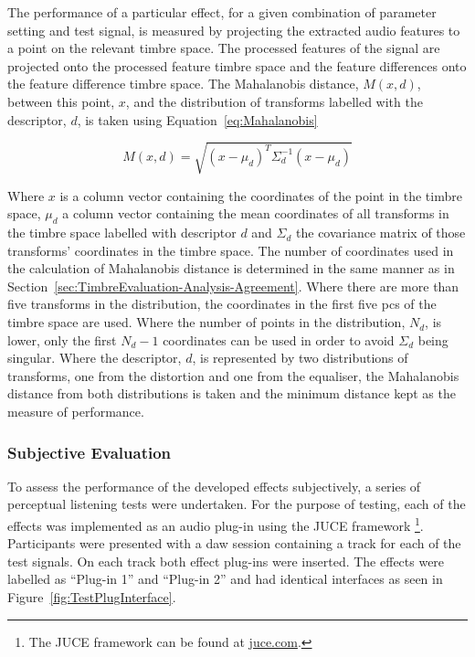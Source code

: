 			The performance of a particular effect, for a given combination of parameter setting and test
			signal, is measured by projecting the extracted audio features to a point on the relevant timbre
			space. The processed features of the signal are projected onto the processed feature timbre space
			and the feature differences onto the feature difference timbre space. The Mahalanobis distance,
			$M(x, d)$, between this point, $x$, and the distribution of transforms labelled with the
			descriptor, $d$, is taken using Equation~\ref{eq:Mahalanobis}
			
			\begin{equation}
				M(x, d) = \sqrt{(x - \mu_{d})^{T}\Sigma_{d}^{-1}(x - \mu_{d})}
				\label{eq:Mahalanobis}
			\end{equation}

			Where $x$ is a column vector containing the coordinates of the point in the timbre space, $\mu_{d}$
			a column vector containing the mean coordinates of all transforms in the timbre space labelled with
			descriptor $d$ and $\Sigma_{d}$ the covariance matrix of those transforms' coordinates in the
			timbre space. The number of coordinates used in the calculation of Mahalanobis distance is
			determined in the same manner as in Section~\ref{sec:TimbreEvaluation-Analysis-Agreement}. Where
			there are more than five transforms in the distribution, the coordinates in the first five
			\acrshort{pc}s of the timbre space are used. Where the number of points in the distribution,
			$N_{d}$, is lower, only the first $N_{d} - 1$ coordinates can be used in order to avoid
			$\Sigma_{d}$ being singular. Where the descriptor, $d$, is represented by two distributions of
			transforms, one from the distortion and one from the equaliser, the Mahalanobis distance from both
			distributions is taken and the minimum distance kept as the measure of performance.
	
		\subsubsection*{Subjective Evaluation}
			To assess the performance of the developed effects subjectively, a series of perceptual listening
			tests were undertaken. For the purpose of testing, each of the effects was implemented as an audio
			plug-in using the JUCE framework \footnote{The JUCE framework can be found at
			\href{https://juce.com}{juce.com}.}. Participants were presented with a \acrshort{daw} session
			containing a track for each of the test signals. On each track both effect plug-ins were inserted.
			The effects were labelled as ``Plug-in 1'' and ``Plug-in 2'' and had identical interfaces as seen
			in Figure~\ref{fig:TestPlugInterface}.

